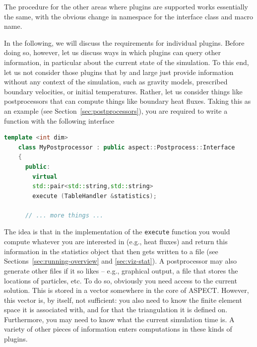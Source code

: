 \documentclass{article}
\newcommand{\aspect}{\textsc{ASPECT}}
\begin{document}
The procedure for the other areas where plugins are supported works
essentially the same, with the obvious change in namespace for the interface
class and macro name.

In the following, we will discuss the requirements for individual plugins. Before
doing so, however, let us discuss ways in which plugins can query other
information, in particular about the current state of the simulation.
To this end, let us not consider those plugins that by and large just
provide information without any context of the simulation, such as gravity models,
prescribed boundary velocities, or initial temperatures. Rather, let us
consider things like postprocessors that can compute things like boundary heat
fluxes. Taking this as an example (see Section~\ref{sec:postprocessors}), you are
required to write a function with the following interface
\begin{lstlisting}[frame=single,language=C++]
    template <int dim>
    class MyPostprocessor : public aspect::Postprocess::Interface
    {
      public:
        virtual
        std::pair<std::string,std::string>
        execute (TableHandler &statistics);

      // ... more things ...
\end{lstlisting}
The idea is that in the implementation of the \texttt{execute} function
you would compute whatever you are interested in (e.g., heat fluxes)
and return this information in the statistics object that then gets written
to a file (see Sections~\ref{sec:running-overview} and \ref{sec:viz-stat}).
A postprocessor may also generate other files if it so likes -- e.g., graphical
output, a file that stores the locations of particles, etc.
To do so, obviously you need access to the current solution. This is
stored in a vector somewhere in the core of \aspect{}. However, this
vector is, by itself, not sufficient: you also need to know the finite
element space it is associated with, and for that the triangulation it
is defined on. Furthermore, you may need to know what the current
simulation time is. A variety of other pieces of information enters
computations in these kinds of plugins.
\end{document}
